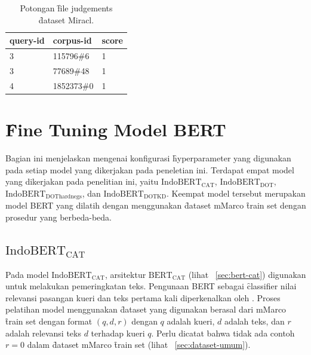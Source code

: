 \begin{table}
    \centering
    \caption{Potongan \f{file} judgements \f{dataset} Miracl.}
    \label{tab:judgements-file-example-bab4}
    \begin{tabular}{|l|l|l|}
        \hline
        \textbf{query-id} & \textbf{corpus-id} & \textbf{score} \\ \hline
        3                 & 115796\#6          & 1              \\ \hline
        3                 & 77689\#48          & 1              \\ \hline
        4                 & 1852373\#0         & 1              \\ \hline
    \end{tabular}
\end{table}


\section{\f{Fine Tuning} Model BERT}
\label{sec:finetuning}

Bagian ini menjelaskan mengenai konfigurasi \f{hyperparameter} yang digunakan pada setiap model yang dikerjakan pada peneletian ini. Terdapat empat model yang dikerjakan pada penelitian ini, yaitu $\text{IndoBERT}_{\text{CAT}}$, $\text{IndoBERT}_{\text{DOT}}$, $\text{IndoBERT}_{\text{DOThardnegs}}$, dan $\text{IndoBERT}_{\text{DOTKD}}$. Keempat model tersebut merupakan model BERT yang dilatih dengan menggunakan \f{dataset} mMarco \f{train set} dengan prosedur yang berbeda-beda.

\subsection{$\text{IndoBERT}_{\text{CAT}}$}

Pada model $\text{IndoBERT}_{\text{CAT}}$, arsitektur $\text{BERT}_\text{CAT}$ (lihat \sect~\ref{sec:bert-cat}) digunakan untuk melakukan pemeringkatan teks. Pengunaan BERT sebagai \f{classifier} nilai relevansi pasangan kueri dan teks pertama kali diperkenalkan oleh \cite{firstRerankingBert}. Proses pelatihan model menggunakan \f{dataset} yang digunakan berasal dari mMarco \f{train set} dengan format $(q, d, r)$ dengan $q$ adalah kueri, $d$ adalah teks, dan $r$ adalah relevansi teks $d$ terhadap kueri $q$. Perlu dicatat bahwa tidak ada contoh $r=0$ dalam \f{dataset} mMarco \f{train set} (lihat \sect~\ref{sec:dataset-umum}).

